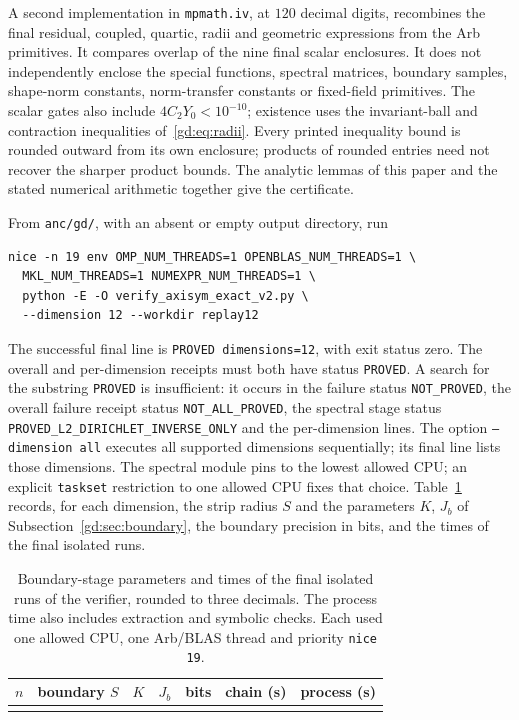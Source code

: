 A second implementation in \texttt{mpmath.iv}, at $120$ decimal digits,
recombines the final residual, coupled, quartic, radii and geometric
expressions from the Arb primitives. It compares overlap of the nine
final scalar enclosures. It does not independently enclose the
special functions, spectral matrices, boundary samples, shape-norm constants, norm-transfer
constants or fixed-field primitives.
The scalar gates also include $4C_2Y_0<10^{-10}$; existence uses
the invariant-ball and contraction inequalities of~\eqref{gd:eq:radii}.
Every printed inequality bound is rounded outward from its own enclosure;
products of rounded entries need not recover the sharper product bounds.
The analytic lemmas of this paper and the stated numerical arithmetic
together give the certificate.

From \texttt{anc/gd/}, with an absent or empty output directory, run
\begin{verbatim}
nice -n 19 env OMP_NUM_THREADS=1 OPENBLAS_NUM_THREADS=1 \
  MKL_NUM_THREADS=1 NUMEXPR_NUM_THREADS=1 \
  python -E -O verify_axisym_exact_v2.py \
  --dimension 12 --workdir replay12
\end{verbatim}
The successful final line is \texttt{PROVED dimensions=12}, with exit
status zero. The overall and per-dimension receipts must both have
status \texttt{PROVED}. A search for the substring
\texttt{PROVED} is insufficient: it occurs in the failure status
\texttt{NOT\_PROVED}, the overall failure receipt status
\texttt{NOT\_ALL\_PROVED}, the spectral stage status
\texttt{PROVED\_L2\_DIRICHLET\_INVERSE\_ONLY} and the per-dimension lines.
The option \texttt{--dimension all} executes all supported dimensions
sequentially; its final line lists those dimensions.
The spectral module pins to the lowest allowed CPU; an explicit
\texttt{taskset} restriction to one allowed CPU fixes that choice.
Table~\ref{gd:tab:replay} records, for each dimension, the strip radius $S$
and the parameters $K$, $J_b$ of Subsection~\ref{gd:sec:boundary}, the
boundary precision in bits, and the times of the final isolated runs.

\begin{table}[htbp]
\centering\small
\def\gdReplayRow#1#2#3#4#5#6#7{$#1$ & $#2$ & $#3$ & $#4$ & $#5$ & $#6$ & $#7$\\}
\begin{tabular}{@{}crrrrrr@{}}
\toprule
$n$ & boundary $S$ & $K$ & $J_b$ & bits & chain (s) & process (s)\\
\midrule
\gdReplayData
\bottomrule
\end{tabular}
\caption{Boundary-stage parameters and times of the final isolated runs of
the verifier, rounded to three decimals. The process time also
includes extraction and symbolic checks. Each used one allowed CPU,
one Arb/BLAS thread and priority \texttt{nice 19}.}
\label{gd:tab:replay}
\end{table}

